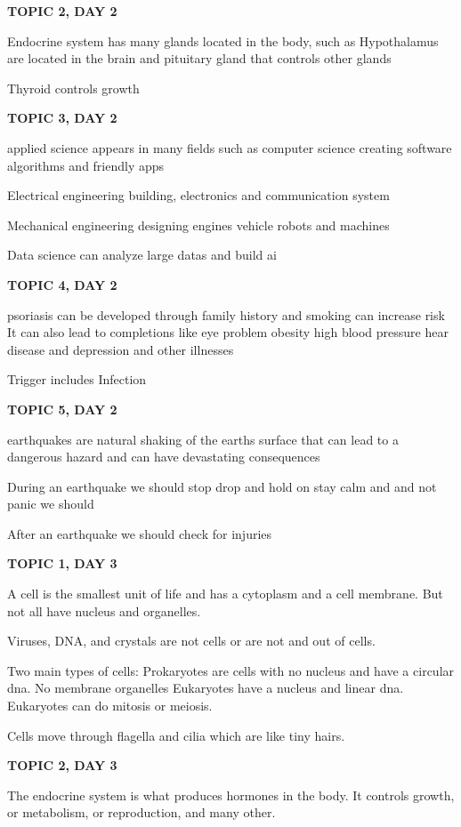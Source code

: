 {{{{\textbf{TOPIC 2, DAY 2}

Endocrine system has many glands located in the body, such as Hypothalamus are located in the brain and pituitary gland that controls other glands 


Thyroid controls growth 

\textbf{TOPIC 3, DAY 2}

applied science appears in many fields such as computer science creating software algorithms and friendly apps


Electrical engineering building, electronics and communication system 


Mechanical engineering designing engines vehicle robots and machines


Data science can analyze large datas and build ai

\textbf{TOPIC 4, DAY 2}

psoriasis can be developed through family history and smoking can increase risk
It can also lead to completions like eye problem obesity high blood pressure hear disease and depression and other illnesses 


Trigger includes
Infection 

\textbf{TOPIC 5, DAY 2}

earthquakes are natural shaking of the earths surface that can lead to a dangerous hazard and can have devastating consequences 


During an earthquake we should stop drop and hold on stay calm and and not panic we should 


After an earthquake we should check for injuries

\textbf{TOPIC 1, DAY 3}

A cell is the smallest unit of life and has a cytoplasm and a cell membrane. But not all have nucleus and organelles. 

Viruses, DNA, and crystals are not cells or are not and out of cells. 

Two main types of cells:
Prokaryotes are cells with no nucleus and have a circular dna. No membrane organelles
Eukaryotes have a nucleus and linear dna. Eukaryotes can do mitosis or meiosis.

Cells move through flagella and cilia which are like tiny hairs.

\textbf{TOPIC 2, DAY 3}

The endocrine system is what produces hormones in the body. It controls growth, or metabolism, or reproduction, and many other.

}}}}
